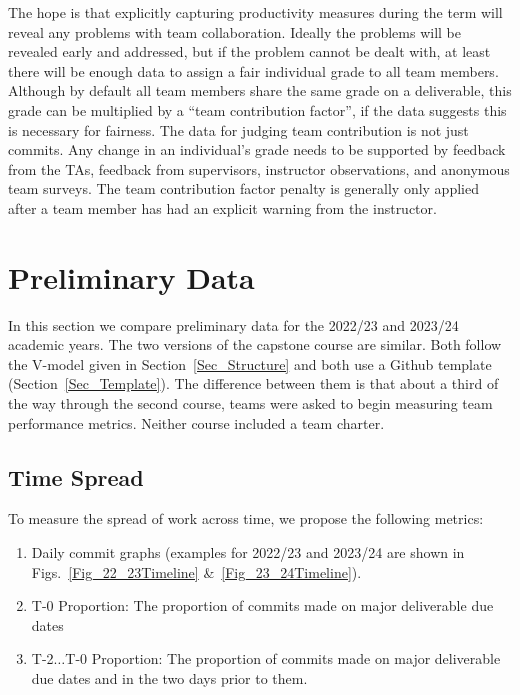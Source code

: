 \documentclass[10pt, conference]{IEEEtran}
\begin{document}
The hope is that explicitly capturing productivity measures during the term will
reveal any problems with team collaboration.  Ideally the problems will be
revealed early and addressed, but if the problem cannot be dealt with, at least
there will be enough data to assign a fair individual grade to all team members.
Although by default all team members share the same grade on a deliverable, this
grade can be multiplied by a ``team contribution factor'', if the data suggests
this is necessary for fairness.  The data for judging team contribution is not
just commits.  Any change in an individual's grade needs to be supported by
feedback from the TAs, feedback from supervisors, instructor observations, and
anonymous team surveys.  The team contribution factor penalty is generally only
applied after a team member has had an explicit warning from the instructor.

\section{Preliminary Data} \label{SecPrelimData}

In this section we compare preliminary data for the 2022/23 and 2023/24 academic
years.  The two versions of the capstone course are similar.  Both follow the
V-model given in Section~\ref{Sec_Structure} and both use a Github template
(Section~\ref{Sec_Template}). The difference between them is that about a third
of the way through the second course, teams were asked to begin measuring team
performance metrics.  Neither course included a team charter.

\subsection{Time Spread}\label{Subsec:TimeSpread}

To measure the spread of work across time, we propose the following
metrics:

\begin{enumerate}
\item Daily commit graphs (examples for 2022/23 and 2023/24 are shown in
Figs.~\ref{Fig_22_23Timeline} \&~\ref{Fig_23_24Timeline}).
\item T-0 Proportion: The proportion of commits made on major deliverable due dates
\item T-2$\ldots$T-0 Proportion: The proportion of commits made on major deliverable due
      dates and in the two days prior to them.
\end{enumerate}
\end{document}
